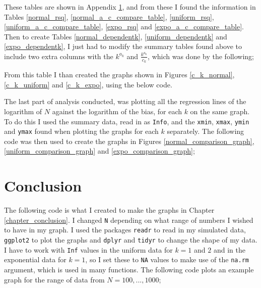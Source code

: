 \documentclass{report}
\begin{document}


These tables are shown in Appendix \ref{}, and from these I found the information in Tables \ref{normal_rsq}, \ref{normal_a_c_compare_table}, \ref{uniform_rsq}, \ref{uniform_a_c_compare_table}, \ref{expo_rsq} and \ref{expo_a_c_compare_table}. Then to create Tables \ref{normal_dependentk}, \ref{uniform_dependentk} and \ref{expo_dependentk}, I just had to modify the summary tables found above to include two extra columns with the $k^{a_{k}}$ and $\frac{k^{a_{k}}}{c_{k}}$, which was done by the following;



From this table I than created the graphs shown in Figures \ref{c_k_normal}, \ref{c_k_uniform} and \ref{c_k_expo}, using the below code.



The last part of analysis conducted, was plotting all the regression lines of the logarithm of $N$ against the logarithm of the bias, for each $k$ on the same graph. To do this I used the summary data, read in as \texttt{Info}, and the \texttt{xmin}, \texttt{xmax}, \texttt{ymin} and \texttt{ymax} found when plotting the graphs for each $k$ separately. The following code was then used to create the graphs in Figures \ref{normal_comparison_graph}, \ref{uniform_comparison_graph} and \ref{expo_comparison_graph};





\section{Conclusion}

The following code is what I created to make the graphs in Chapter \ref{chapter_conclusion}. I changed \texttt{N} depending on what range of numbers I wished to have in my graph. I used the packages \texttt{readr} to read in my simulated data, \texttt{ggplot2} to plot the graphs and \texttt{dplyr} and \texttt{tidyr} to change the shape of my data. I have to work with \texttt{Inf} values in the uniform data for $k=1$ and $2$ and in the exponential data for $k=1$, so I set these to \texttt{NA} values to make use of the \texttt{na.rm} argument, which is used in many functions. The following code plots an example graph for the range of data from $N=100,..., 1000$;








\end{document}
